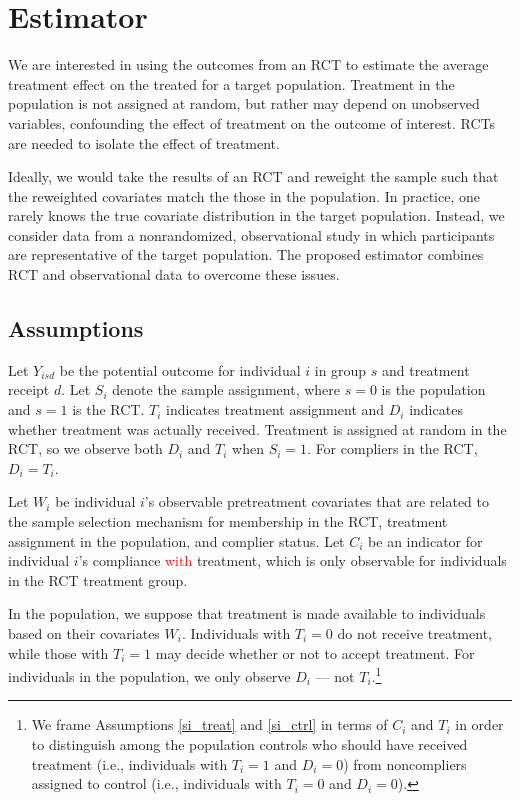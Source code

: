 \documentclass[hidelinks,12pt]{article}
\begin{document}
\section{Estimator} \label{estimator} %
We are interested in using the outcomes from an RCT to estimate the average treatment effect on the treated for a target population. Treatment in the population is not assigned at random, but rather may depend on unobserved variables, confounding the effect of treatment on the outcome of interest. RCTs are needed to isolate the effect of treatment. 

Ideally, we would take the results of an RCT and reweight the sample such that the reweighted covariates match the those in the population. In practice, one rarely knows the true covariate distribution in the target population. Instead, we consider data from a nonrandomized, observational study in which participants are representative of the target population. The proposed estimator combines RCT and observational data to overcome these issues.

\subsection{Assumptions} \label{assumptions}
Let $Y_{isd}$ be the potential outcome for individual $i$ in group $s$ and treatment receipt $d$. Let $S_i$ denote the sample assignment, where $s=0$ is the population and $s=1$ is the RCT. $T_i$ indicates treatment assignment and $D_i$ indicates whether treatment was actually received. Treatment is assigned at random in the RCT, so we observe both $D_i$ and $T_i$ when $S_i = 1$. For compliers in the RCT, $D_i = T_i$.

Let $W_i$ be individual $i$'s observable pretreatment covariates that are related to the sample selection mechanism for membership in the RCT, treatment assignment in the population, and complier status. Let $C_i$ be an indicator for individual $i$'s compliance \textcolor{red}{with} treatment, which is only observable for individuals in the RCT treatment group. 

In the population, we suppose that treatment is made available to individuals based on their covariates $W_i$. Individuals with $T_i = 0$ do not receive treatment, while those with $T_i=1$ may decide whether or not to accept treatment. For individuals in the population, we only observe $D_i$ --- not $T_i$.\footnote{We frame Assumptions \eqref{si_treat} and \eqref{si_ctrl} in terms of $C_i$ and $T_i$ in order to distinguish among the population controls who should have received treatment (i.e., individuals with $T_i = 1$ and $D_i = 0$) from noncompliers assigned to control (i.e., individuals with $T_i = 0$ and $D_i = 0$).}
\end{document}

